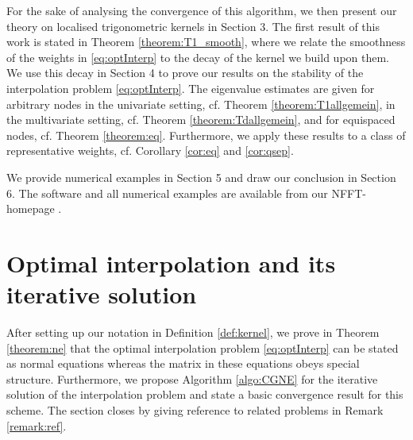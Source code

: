 \documentclass[11pt,a4paper,bibtotoc]{scrartcl}
\numberwithin{equation}{section}
\numberwithin{table}{section}
\numberwithin{figure}{section}
\begin{document}
For the sake of analysing the convergence of this algorithm, we then present
our theory on localised trigonometric kernels in Section 3.
The first result of this work is stated in Theorem
\ref{theorem:T1_smooth}, where we relate the smoothness of the weights in
\eqref{eq:optInterp} to the decay of the kernel we build upon them.
We use this decay in Section 4 to prove our results on the stability of the
interpolation problem \eqref{eq:optInterp}.
The eigenvalue estimates are given for arbitrary nodes in the univariate
setting, cf. Theorem \ref{theorem:T1allgemein}, in the multivariate setting,
cf. Theorem \ref{theorem:Tdallgemein}, and for equispaced nodes,  cf. Theorem 
\ref{theorem:eq}.
Furthermore, we apply these results to a class of representative weights,
cf. Corollary \ref{cor:eq} and \ref{cor:qsep}.

We provide numerical examples in Section 5 and draw our conclusion in
Section 6.
The software and all numerical examples are available from our NFFT-homepage
\cite{kupo02C}.

\section{Optimal interpolation and its iterative solution}
\label{sect:optInterp}
After setting up our notation in Definition \ref{def:kernel}, we prove in
Theorem \ref{theorem:ne} that the optimal interpolation problem
\eqref{eq:optInterp} can be stated as normal equations whereas the matrix in
these equations obeys special structure.
Furthermore, we propose Algorithm \ref{algo:CGNE} for the iterative solution
of the interpolation problem and state a basic convergence result for this
scheme.
The section closes by giving reference to related problems in Remark
\ref{remark:ref}.
\end{document}
